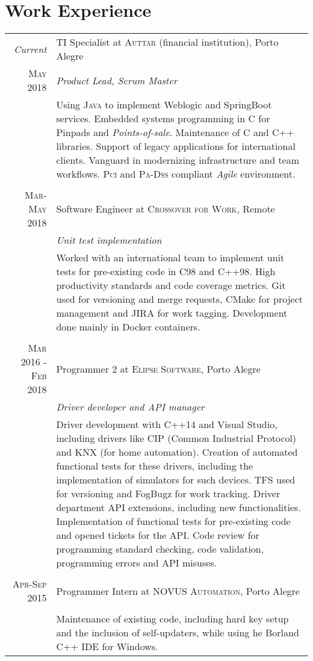 \documentclass[a4paper,10pt]{article}
\begin{document}
\section{Work Experience}
\begin{tabular}{r|p{11cm}}
    \emph{Current} & TI Specialist at \textsc{Auttar} (financial institution), Porto Alegre \\\textsc{May 2018}&\emph{Product Lead, Scrum Master}\\&\footnotesize{Using \textsc{Java} to implement Weblogic and SpringBoot services. Embedded systems programming in C for Pinpads and \emph{Points-of-sale}. Maintenance of C and C++ libraries. Support of legacy applications for international clients. Vanguard in modernizing infrastructure and team workflows. \textsc{Pci} and \textsc{Pa-Dss} compliant \emph{Agile} environment. }
 
    \\ \multicolumn{2}{c}{} \\ \textsc{Mar-May 2018} & Software Engineer at \textsc{Crossover for Work}, Remote \\&\emph{Unit test implementation}\\&\footnotesize{Worked with an international team to implement unit tests for pre-existing code in C98 and C++98. High productivity standards and code coverage metrics. Git used for versioning and merge requests, CMake for project management and JIRA for work tagging. Development done mainly in Docker containers.}
 
    \\ \multicolumn{2}{c}{} \\ \textsc{Mar 2016 - Feb 2018} & Programmer 2 at \textsc{Elipse Software}, Porto Alegre \\&\emph{Driver developer and API manager}\\&\footnotesize{Driver development with C++14 and Visual Studio, including drivers like CIP (Common Industrial Protocol) and KNX (for home automation). Creation of automated functional tests for these drivers, including the implementation of simulators for such devices. TFS used for versioning and FogBugz for work tracking. Driver department API extensions, including new functionalities. Implementation of functional tests for pre-existing code and opened tickets for the API. Code review for programming standard checking, code validation, programming errors and API misuses.}
 
    \\ \multicolumn{2}{c}{} \\ \textsc{Apr-Sep 2015} & Programmer Intern at \textsc{NOVUS Automation}, Porto Alegre \\&\emph{}\\&\footnotesize{Maintenance of existing code, including hard key setup and the inclusion of self-updaters, while using he Borland C++ IDE for Windows. }
\end{tabular}
\end{document}
